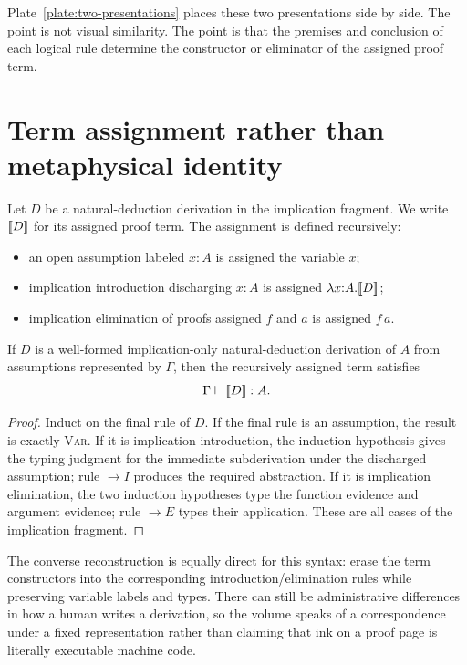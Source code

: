Plate~\ref{plate:two-presentations} places these two presentations side by side. The point is not visual similarity. The point is that the premises and conclusion of each logical rule determine the constructor or eliminator of the assigned proof term.



\section{Term assignment rather than metaphysical identity}

Let $D$ be a natural-deduction derivation in the implication fragment. We write $\lbrack\!\lbrack D\rbrack\!\rbrack$ for its assigned proof term. The assignment is defined recursively:

\begin{itemize}
\item an open assumption labeled $x{:}A$ is assigned the variable $x$;
\item implication introduction discharging $x{:}A$ is assigned $\lambda x{:}A.\lbrack\!\lbrack D\rbrack\!\rbrack$;
\item implication elimination of proofs assigned $f$ and $a$ is assigned $f\,a$.
\end{itemize}

\begin{proposition}
\label{prop:rule-term-assignment}
If $D$ is a well-formed implication-only natural-deduction derivation of $A$ from assumptions represented by $\Gamma$, then the recursively assigned term satisfies
\[
 \Gamma\vdash \lbrack\!\lbrack D\rbrack\!\rbrack:A.
\]
\end{proposition}

\begin{proof}
Induct on the final rule of $D$. If the final rule is an assumption, the result is exactly \textsc{Var}. If it is implication introduction, the induction hypothesis gives the typing judgment for the immediate subderivation under the discharged assumption; rule $\to I$ produces the required abstraction. If it is implication elimination, the two induction hypotheses type the function evidence and argument evidence; rule $\to E$ types their application. These are all cases of the implication fragment.
\end{proof}

The converse reconstruction is equally direct for this syntax: erase the term constructors into the corresponding introduction/elimination rules while preserving variable labels and types. There can still be administrative differences in how a human writes a derivation, so the volume speaks of a correspondence under a fixed representation rather than claiming that ink on a proof page is literally executable machine code.

